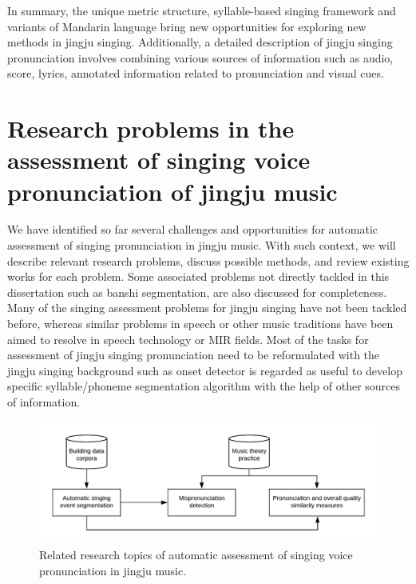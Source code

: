 In summary, the unique metric structure, syllable-based singing framework and variants of Mandarin language bring new opportunities for exploring new methods in jingju singing. Additionally, a detailed description of jingju singing pronunciation involves combining various sources of information such as audio, score, lyrics, annotated information related to pronunciation and visual cues.

\section{Research problems in the assessment of singing voice pronunciation of jingju music}

We have identified so far several challenges and opportunities for automatic assessment of singing pronunciation in jingju music. With such context, we will describe relevant research problems, discuss possible methods, and review existing works for each problem. Some associated problems not directly tackled in this dissertation such as banshi segmentation, are also discussed for completeness. Many of the singing assessment problems for jingju singing have not been tackled before, whereas similar problems in speech or other music traditions have been aimed to resolve in speech technology or MIR fields. Most of the tasks for assessment of jingju singing pronunciation need to be reformulated with the jingju singing background such as onset detector is regarded as useful to develop specific syllable/phoneme segmentation algorithm with the help of other sources of information.

\begin{figure}[ht!]
\includegraphics[width=\textwidth]{figs/blockDiags_rong/ch3_related_topics.png}
\caption{Related research topics of automatic assessment of singing voice pronunciation in jingju music.}
\label{fig:related_research_topics}
\end{figure}

